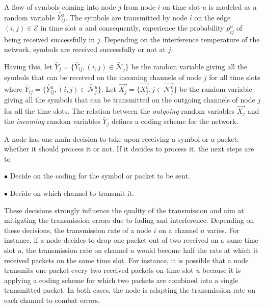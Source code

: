 \documentclass[a4paper]{article}
\newcommand{\E}{\mathcal{E}}
\newcommand{\Nout}[2]{ \overrightarrow{ \mathcal{N}_{#1}^{#2} } }
\newcommand{\Nin}[2]{ \overleftarrow{ \mathcal{N}_{#1}^{#2} } }
\begin{document}
A flow of symbols  coming into node $j$ from node $i$ on time slot $u$ is modeled as a random variable $\overleftarrow{Y_{ij}^u}$. The symbols are transmitted by node $i$ on the edge $(i,j) \in \E$ in time slot $u$ and consequently, experience the probability $p_{ij}^u$ of being received successfully in $j$. Depending on the interference temperature of the network, symbols are received successfully or not at $j$. 

Having this, let $\overleftarrow{Y_j} = \{ \overleftarrow{Y_{ij}}, (i,j) \in \Nin{j}{}\}$ be the random variable giving all the symbols that can be received on the incoming channels of node $j$ for all time slots where $\overleftarrow{Y_{ij}}=\{\overleftarrow{Y_{ij}^u}, (i,j) \in \Nin{j}{u}\}$. 
Let $\overrightarrow{X_j}=\{\overrightarrow{X_j^v}, j \in \Nout{j}{v}\}$ be the random variable giving all the symbols that can be transmitted on the outgoing channels of node $j$ for all the time slots. 
The relation between the \emph{outgoing} random variables $\overrightarrow{X_j}$ and the \emph{incoming} random variables  $\overleftarrow{Y_j}$ defines a coding scheme for the network.
 
A node has one main decision to take upon receiving a symbol or a packet: whether it should process it or not. If it decides to process it, the next steps are to


$\bullet$ Decide on the coding for the symbol or packet to be sent. 

$\bullet$ Decide on which channel to transmit it. 

These decisions strongly influence the quality of the transmission and aim at mitigating the transmission errors due to fading and interference. 
Depending on these decisions, the transmission rate of a node $i$ on a channel $u$ varies. For instance, if a node decides to drop one packet out of two received on a same time slot $u$, the transmission rate on channel $u$ would become half the rate at which it received packets on the same time slot. 
For instance, it is possible that a node transmits one packet every two received packets on time slot $u$ because it is applying a coding scheme for which two packets are combined into a single transmitted packet. In both cases, the node is adapting the transmission rate on each channel to combat errors.   
\end{document}
